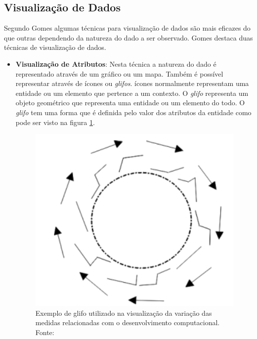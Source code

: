\subsection{Visualização de Dados}
Segundo Gomes \cite{gomes_percepcao_2011} algumas técnicas para visualização de dados são mais eficazes do que outras dependendo da natureza do dado a ser observado. Gomes destaca duas técnicas de visualização de dados.

\begin{itemize}
\item \textbf{Visualização de Atributos}: Nesta técnica a natureza do dado é representado através de um gráfico ou um mapa. Também é possível representar através de ícones ou \textit{glifos}. ícones normalmente representam uma entidade ou um elemento que pertence a um contexto. O \textit{glifo} representa um objeto geométrico que representa uma entidade ou um elemento do todo. O \textit{glifo} tem uma forma que é definida pelo valor dos atributos da entidade como pode ser visto na figura \ref{img:glifo}.
\graphicspath{{figuras/}}
\begin{figure}[h]
\centering
\includegraphics[scale=0.5]{Glifo}
\caption{Exemplo de glifo utilizado na visualização da variação das medidas relacionadas com o desenvolvimento computacional. Fonte: \cite{gomes_percepcao_2011}}
\label{img:glifo}
\end{figure}


\end{itemize}
